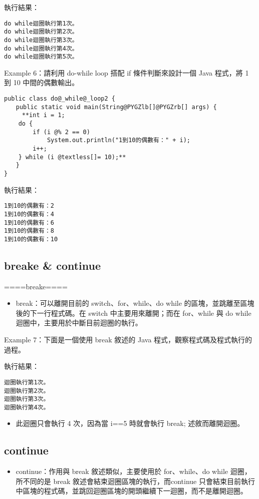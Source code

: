 \documentclass[a4paper,12pt,english]{sphinxmanual}
\begin{document}
執行結果：

\begin{Verbatim}[commandchars=@\[\]]
do while迴圈執行第1次。
do while迴圈執行第2次。
do while迴圈執行第3次。
do while迴圈執行第4次。
do while迴圈執行第5次。
\end{Verbatim}

Example 6：請利用 do-while loop 搭配 if 條件判斷來設計一個 Java 程式，將 1 到 10 中間的偶數輸出。

\begin{Verbatim}[commandchars=@\[\]]
public class do@_while@_loop2 {
　　public static void main(String@PYGZlb[]@PYGZrb[] args) {
     **int i = 1;
    do {
        if (i @% 2 == 0)
            System.out.println("1到10的偶數有：" + i);
        i++;
    } while (i @textless[]= 10);**
　　}
}
\end{Verbatim}

執行結果：

\begin{Verbatim}[commandchars=@\[\]]
1到10的偶數有：2
1到10的偶數有：4
1到10的偶數有：6
1到10的偶數有：8
1到10的偶數有：10
\end{Verbatim}


\subsection{breake \& continue}
\label{java_loop:breake-continue}
====breake====
\begin{itemize}
\item {} 
break：可以離開目前的 switch、for、while、do while 的區塊，並跳離至區塊後的下一行程式碼。在 switch 中主要用來離開；而在 for、while 與 do while 迴圈中，主要用於中斷目前迴圈的執行。

\end{itemize}

Example 7：下面是一個使用 break 敘述的 Java 程式，觀察程式碼及程式執行的過程。

執行結果：

\begin{Verbatim}[commandchars=@\[\]]
迴圈執行第1次。
迴圈執行第2次。
迴圈執行第3次。
迴圈執行第4次。
\end{Verbatim}
\begin{itemize}
\item {} 
此迴圈只會執行 4 次，因為當 i==5 時就會執行 break; 述敘而離開迴圈。

\end{itemize}


\subsection{continue}
\label{java_loop:continue}\begin{itemize}
\item {} 
continue：作用與 break 敘述類似，主要使用於 for、while、do while 迴圈，所不同的是 break 敘述會結束迴圈區塊的執行，而continue 只會結束目前執行中區塊的程式碼，並跳回迴圈區塊的開頭繼續下一迴圈，而不是離開迴圈。

\end{itemize}
\end{document}
